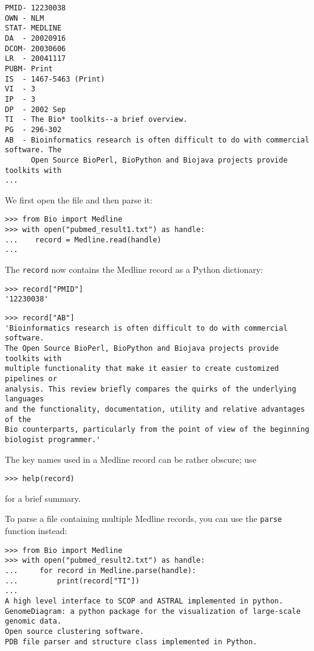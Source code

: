 \begin{verbatim}
PMID- 12230038
OWN - NLM
STAT- MEDLINE
DA  - 20020916
DCOM- 20030606
LR  - 20041117
PUBM- Print
IS  - 1467-5463 (Print)
VI  - 3
IP  - 3
DP  - 2002 Sep
TI  - The Bio* toolkits--a brief overview.
PG  - 296-302
AB  - Bioinformatics research is often difficult to do with commercial software. The
      Open Source BioPerl, BioPython and Biojava projects provide toolkits with
...
\end{verbatim}
We first open the file and then parse it:

\begin{verbatim}
>>> from Bio import Medline
>>> with open("pubmed_result1.txt") as handle:
...    record = Medline.read(handle)
...
\end{verbatim}
The \verb+record+ now contains the Medline record as a Python dictionary:

\begin{verbatim}
>>> record["PMID"]
'12230038'
\end{verbatim}
\begin{verbatim}
>>> record["AB"]
'Bioinformatics research is often difficult to do with commercial software.
The Open Source BioPerl, BioPython and Biojava projects provide toolkits with
multiple functionality that make it easier to create customized pipelines or
analysis. This review briefly compares the quirks of the underlying languages
and the functionality, documentation, utility and relative advantages of the
Bio counterparts, particularly from the point of view of the beginning
biologist programmer.'
\end{verbatim}
The key names used in a Medline record can be rather obscure; use
\begin{verbatim}
>>> help(record)
\end{verbatim}
for a brief summary.

To parse a file containing multiple Medline records, you can use the \verb+parse+ function instead:

\begin{verbatim}
>>> from Bio import Medline
>>> with open("pubmed_result2.txt") as handle:
...     for record in Medline.parse(handle):
...         print(record["TI"])
...
A high level interface to SCOP and ASTRAL implemented in python.
GenomeDiagram: a python package for the visualization of large-scale genomic data.
Open source clustering software.
PDB file parser and structure class implemented in Python.
\end{verbatim}

